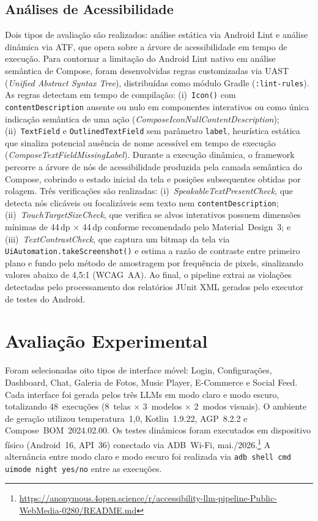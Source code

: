 \documentclass[sigconf,anonymous,review]{webmedia}
\begin{document}
\subsection{Análises de Acessibilidade}
\label{sec:customlint}

Dois tipos de avaliação são realizados: análise estática via
Android Lint e análise dinâmica via ATF, que opera sobre a árvore
de acessibilidade em tempo de execução. Para contornar a limitação
do Android Lint nativo em análise semântica de Compose, foram
desenvolvidas regras customizadas via UAST
(\textit{Unified Abstract Syntax Tree}), distribuídas como módulo
Gradle (\texttt{:lint-rules}). As regras detectam em tempo de
compilação: (i)~\texttt{Icon()} com \texttt{contentDescription}
ausente ou nulo em componentes interativos ou como única indicação
semântica de uma ação (\textit{ComposeIconNullContentDescription});
(ii)~\texttt{TextField} e \texttt{OutlinedTextField} sem parâmetro
\texttt{label}, heurística estática que sinaliza potencial ausência
de nome acessível em tempo de execução
(\textit{ComposeTextFieldMissingLabel}).
Durante a execução dinâmica, o framework percorre a árvore de nós
de acessibilidade produzida pela camada semântica do Compose,
cobrindo o estado inicial da tela e posições subsequentes obtidas
por rolagem. Três verificações são realizadas:
(i)~\textit{SpeakableTextPresentCheck}, que detecta nós clicáveis ou focalizáveis sem texto nem \texttt{contentDescription};
(ii)~\textit{TouchTargetSizeCheck}, que verifica se alvos
interativos possuem dimensões mínimas de 44\,dp $\times$ 44\,dp
conforme recomendado pelo Material~Design~3; e (iii)~\textit{TextContrastCheck}, que captura um bitmap da tela via
\texttt{UiAutomation.takeScreenshot()} e estima a razão de contraste
entre primeiro plano e fundo pelo método de amostragem por
frequência de pixels, sinalizando valores abaixo de 4,5:1 (WCAG~AA).
Ao final, o pipeline extrai as violações detectadas pelo
processamento dos relatórios JUnit XML gerados pelo executor de
testes do Android.

\section{Avaliação Experimental}
\label{sec:avaliacao}

Foram selecionadas oito tipos de interface móvel: Login, Configurações,
Dashboard, Chat, Galeria de Fotos, Music Player, E-Commerce e Social Feed.
Cada interface foi gerada pelos três LLMs em modo claro e modo escuro,
totalizando 48~execuções (8~telas $\times$ 3~modelos $\times$ 2~modos
visuais). O ambiente de geração utilizou temperatura~1,0, Kotlin~1.9.22,
AGP~8.2.2 e Compose~BOM~2024.02.00. Os testes dinâmicos foram executados
em dispositivo físico (Android~16, API~36) conectado via ADB~Wi-Fi,
mai./2026.\footnote{\url{https://anonymous.4open.science/r/accessibility-llm-pipeline-Public-WebMedia-0280/README.md}}
A alternância entre modo claro e modo escuro foi realizada via
\texttt{adb shell cmd uimode night yes/no} entre as execuções.
\end{document}
